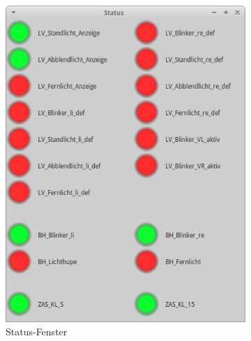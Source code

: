 \documentclass[
  a4paper,					    %
  twoside,
  DIV=calc,     				%
  bibliography=totoc,
  cleardoublepage=empty,
  ngerman,     					%
  final       					%
]{scrbook}
\begin{document}
\begin{figure}
    \centering
    \begin{subfigure}[b]{0.59\textwidth}
        \centering
        \includegraphics[width=\textwidth]{vcan_app_status}
        \caption{Status-Fenster}
        \label{fig:vcan_app_status}
    \end{subfigure}
    \begin{subfigure}[b]{0.39\textwidth}
        \centering

\end{subfigure}
\end{figure}
\end{document}
